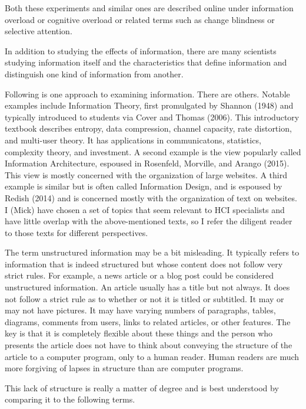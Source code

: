 Both these experiments and similar ones are described online under
information overload or cognitive overload or related terms such as
change blindness or selective attention.

In addition to studying the effects of information, there are many
scientists studying information itself and the characteristics that
define information and distinguish one kind of information from another.

Following is one approach to examining information. There are others.
Notable examples include Information Theory, first promulgated by
Shannon (1948) and typically introduced to students via Cover and Thomas
(2006). This introductory textbook describes entropy, data compression,
channel capacity, rate distortion, and multi-user theory. It has
applications in communicatons, statistics, complexity theory, and
investment. A second example is the view popularly called Information
Architecture, espoused in Rosenfeld, Morville, and Arango (2015). This
view is mostly concerned with the organization of large websites. A
third example is similar but is often called Information Design, and is
espoused by Redish (2014) and is concerned mostly with the organization
of text on websites. I (Mick) have chosen a set of topics that seem
relevant to HCI specialists and have little overlap with the
above-mentioned texts, so I refer the diligent reader to those texts for
different perspectives.

\hypertarget{unstructured-information}{%
\label{unstructured-information}}

The term unstructured information may be a bit misleading. It typically
refers to information that is indeed structured but whose content does
not follow very strict rules. For example, a news article or a blog post
could be considered unstructured information. An article usually has a
title but not always. It does not follow a strict rule as to whether or
not it is titled or subtitled. It may or may not have pictures. It may
have varying numbers of paragraphs, tables, diagrams, comments from
users, links to related articles, or other features. The key is that it
is completely flexible about these things and the person who presents
the article does not have to think about conveying the structure of the
article to a computer program, only to a human reader. Human readers are
much more forgiving of lapses in structure than are computer programs.

This lack of structure is really a matter of degree and is best
understood by comparing it to the following terms.

